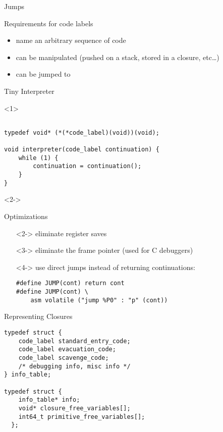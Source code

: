 \documentclass{beamer}
\begin{document}
\begin{frame}{Jumps}
  \begin{block}{Requirements for code labels}
    \begin{itemize}
    \item name an arbitrary sequence of code
    \item can be manipulated (pushed on a stack, stored in a closure, etc\ldots)
    \item can be jumped to
    \end{itemize}
  \end{block}
\end{frame}

\begin{frame}[fragile]{Tiny Interpreter}
  \begin{onlyenv}<1>
    \begin{verbatim}

typedef void* (*(*code_label)(void))(void);

void interpreter(code_label continuation) {
    while (1) {
        continuation = continuation();
    }
}
    \end{verbatim}
  \end{onlyenv}

  \begin{onlyenv}<2->
    \begin{block}{Optimizations}
      \begin{itemize}
      \item[]<2-> eliminate register saves
      \item[]<3-> eliminate the frame pointer (used for C debuggers)
      \item[]<4-> use direct jumps instead of returning continuations:
        \begin{verbatim}
#define JUMP(cont) return cont
#define JUMP(cont) \
    asm volatile ("jump %P0" : "p" (cont))
        \end{verbatim}
      \end{itemize}
    \end{block}
  \end{onlyenv}
\end{frame}

\begin{frame}[fragile]{Representing Closures}
  \begin{verbatim}
typedef struct {
    code_label standard_entry_code;
    code_label evacuation_code;
    code_label scavenge_code;
    /* debugging info, misc info */
} info_table;

typedef struct {
    info_table* info;
    void* closure_free_variables[];
    int64_t primitive_free_variables[];
  };
  \end{verbatim}
\end{frame}
\end{document}
